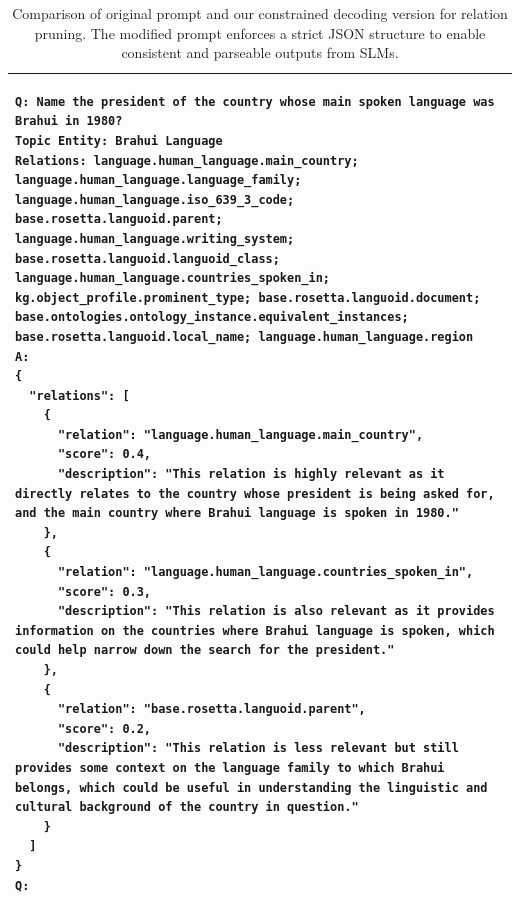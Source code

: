 \documentclass[11pt]{article}
\begin{document}
\begin{table}[t]
\begin{tabular}{|p{}|}
\begin{lstlisting}[basicstyle=\small\rmfamily,lineskip=0.2ex,aboveskip=0ex,belowskip=0ex,breaklines=true,columns=fullflexible ]
Q: Name the president of the country whose main spoken language was Brahui in 1980?
Topic Entity: Brahui Language
Relations: language.human_language.main_country; language.human_language.language_family; language.human_language.iso_639_3_code; base.rosetta.languoid.parent; language.human_language.writing_system; base.rosetta.languoid.languoid_class; language.human_language.countries_spoken_in; kg.object_profile.prominent_type; base.rosetta.languoid.document; base.ontologies.ontology_instance.equivalent_instances; base.rosetta.languoid.local_name; language.human_language.region
A: 
{
  "relations": [
    {
      "relation": "language.human_language.main_country",
      "score": 0.4,
      "description": "This relation is highly relevant as it directly relates to the country whose president is being asked for, and the main country where Brahui language is spoken in 1980."
    },
    {
      "relation": "language.human_language.countries_spoken_in",
      "score": 0.3,
      "description": "This relation is also relevant as it provides information on the countries where Brahui language is spoken, which could help narrow down the search for the president."
    },
    {
      "relation": "base.rosetta.languoid.parent",
      "score": 0.2,
      "description": "This relation is less relevant but still provides some context on the language family to which Brahui belongs, which could be useful in understanding the linguistic and cultural background of the country in question."
    }
  ]
}
Q: 
\end{lstlisting}
\\
\hline
\end{tabular}
\caption{Comparison of original prompt and our constrained decoding version for relation pruning. The modified prompt enforces a strict JSON structure to enable consistent and parseable outputs from SLMs.}
\label{tab:relation_prompt_comparison}
\end{table}
\end{document}
